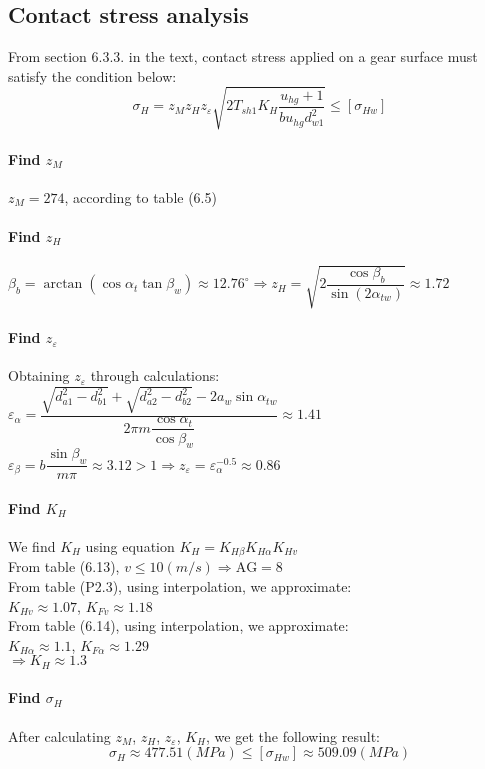 \subsection{Contact stress analysis}
From section 6.3.3. in the text, contact stress applied on a gear surface must satisfy the condition below:
\[
	\sigma_H = z_Mz_Hz_\varepsilon\sqrt{2T_{sh1}K_H\dfrac{u_{hg}+1}{bu_{hg}d_{w1}^2}} \leq [{\sigma}_{Hw}]
\]

\paragraph{Find $ z_M $}
$ z_M = 274 $, according to table (6.5) 
\paragraph{Find $ z_H $}
$ \beta_b = \arctan\left( \cos\alpha_t\tan\beta_w\right) \approx 12.76^\circ \Rightarrow z_H = \sqrt{2\dfrac{\cos\beta_{b}}{\sin(2\alpha_{tw})}} \approx 1.72$
\paragraph{Find $ z_\varepsilon $} Obtaining $ z_\varepsilon $ through calculations:\\
$ \varepsilon_\alpha = \dfrac{\sqrt{d_{a1}^2-d_{b1}^2}+\sqrt{d_{a2}^2-d_{b2}^2}-2a_w\sin\alpha_{tw}}{2\pi m\dfrac{\cos\alpha_t}{\cos\beta_w}} \approx 1.41$\\
$ \varepsilon_\beta = b\dfrac{\sin\beta_w}{m\pi} \approx 3.12>1 \Rightarrow z_\varepsilon = \varepsilon_\alpha^{-0.5} \approx 0.86 $
\paragraph{Find $ K_H $} We find $ K_H $ using equation $ K_H = K_{H\beta}K_{H\alpha}K_{Hv} $\\
From table (6.13), $ v\leq 10 \unit{(m/s)}\Rightarrow \text{AG} = 8 $ \\
From table (P2.3), using interpolation, we approximate:\\ $ K_{Hv} \approx1.07$, $ K_{Fv} \approx1.18$\\
From table (6.14), using interpolation, we approximate:\\ $ K_{H\alpha} \approx1.1$, $ K_{F\alpha} \approx1.29 $ \\	
$ \Rightarrow K_H \approx 1.3 $
\paragraph{Find $ \sigma_H $} After calculating $ z_M $, $ z_H $, $ z_\varepsilon $, $ K_H $, we get the following result:
	\[\sigma_H \approx 477.51 \unit{(MPa)}\leq [{\sigma}_{Hw}] \approx 509.09 \unit{(MPa)}\] 

